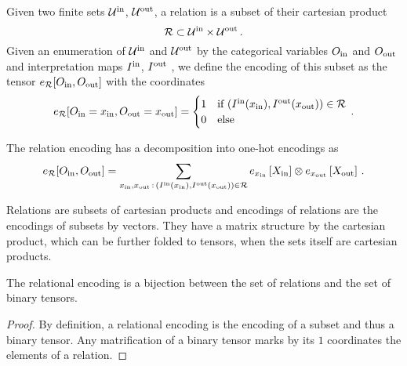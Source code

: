\begin{definition}
	Given two finite sets $\mathcal{U}^{\mathrm{in}}$, $\mathcal{U}^{\mathrm{out}}$, a relation is a subset of their cartesian product
		\[ \mathcal{R} \subset \mathcal{U}^{\mathrm{in}} \times \mathcal{U}^{\mathrm{out}} \, . \]
	Given an enumeration of $\mathcal{U}^{\mathrm{in}}$ and $\mathcal{U}^{\mathrm{out}}$ by the categorical variables $O_{\mathrm{in}}$ and $O_{\mathrm{out}}$ and interpretation maps 
	$I^{\mathrm{in}}$, $I^{\mathrm{out}}$
	, we define the encoding of this subset as the tensor $e_{\mathcal{R}}[O_{\mathrm{in}},O_{\mathrm{out}}]$ with the coordinates
	\begin{align}
		e_{\mathcal{R}}[O_{\mathrm{in}}=x_{\mathrm{in}},O_{\mathrm{out}}=x_{\mathrm{out}}]
		= \begin{cases}
		1 & \text{if } (I^{\mathrm{in}}(x_{\mathrm{in}}),I^{\mathrm{out}}(x_{\mathrm{out}})) \in \mathcal{R} \\
		0 & \text{else}
		\end{cases} \, . 
	\end{align}
\end{definition}

The relation encoding has a decomposition into one-hot encodings as
	\[ e_{\mathcal{R}}[O_{\mathrm{in}},O_{\mathrm{out}}]
	 = \sum_{x_{\mathrm{in}},x_{\mathrm{out}} \, : \, (I^{\mathrm{in}}(x_{\mathrm{in}}),I^{\mathrm{out}}(x_{\mathrm{out}})) \in \mathcal{R}}
	e_{x_{\mathrm{in}}}\left[X_{\mathrm{in}}\right]  \otimes e_{x_{\mathrm{out}}}\left[X_{\mathrm{out}}\right]  \, . \]

Relations are subsets of cartesian products and encodings of relations are the encodings of subsets by vectors.
They have a matrix structure by the cartesian product, which can be further folded to tensors, when the sets itself are cartesian products.


\begin{theorem}
	The relational encoding is a bijection between the set of relations and the set of binary tensors.
\end{theorem}
\begin{proof}
	By definition, a relational encoding is the encoding of a subset and thus a binary tensor.
	Any matrification of a binary tensor marks by its $1$ coordinates the elements of a relation.
\end{proof}

